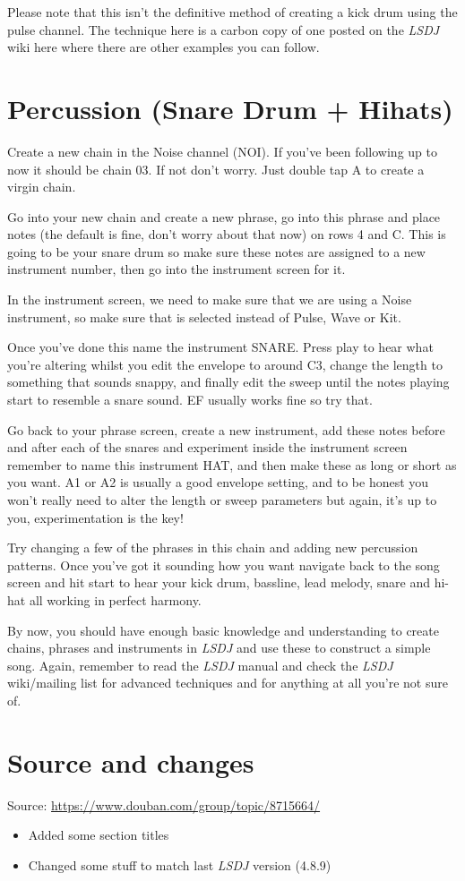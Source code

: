 \documentclass[]{article}
\newcommand{\lsdj}{\textit{LSDJ}\xspace}
\begin{document}
Please note that this isn't the definitive method of creating a kick drum using the pulse channel. The technique here is a carbon copy of one posted on the \lsdj wiki here where there are other examples you can follow.


\section{Percussion (Snare Drum + Hihats)}

Create a new chain in the Noise channel (NOI). If you've been following up to now it should be chain 03. If not don't worry. Just double tap A to create a virgin chain.

Go into your new chain and create a new phrase, go into this phrase and place notes (the default is fine, don't worry about that now) on rows 4 and C. This is going to be your snare drum so make sure these notes are assigned to a new instrument number, then go into the instrument screen for it.

In the instrument screen, we need to make sure that we are using a Noise instrument, so make sure that is selected instead of Pulse, Wave or Kit.

Once you've done this name the instrument SNARE. Press play to hear what you're altering whilst you edit the envelope to around C3, change the length to something that sounds snappy, and finally edit the sweep until the notes playing start to resemble a snare sound. EF usually works fine so try that.

Go back to your phrase screen, create a new instrument, add these notes before and after each of the snares and experiment inside the instrument screen remember to name this instrument HAT, and then make these as long or short as you want. A1 or A2 is usually a good envelope setting, and to be honest you won't really need to alter the length or sweep parameters but again, it's up to you, experimentation is the key!

Try changing a few of the phrases in this chain and adding new percussion patterns. Once you've got it sounding how you want navigate back to the song screen and hit start to hear your kick drum, bassline, lead melody, snare and hi-hat all working in perfect harmony.

By now, you should have enough basic knowledge and understanding to create chains, phrases and instruments in \lsdj and use these to construct a simple song. Again, remember to read the \lsdj manual and check the \lsdj wiki/mailing list for advanced techniques and for anything at all you're not sure of.


\section*{Source and changes}

Source: \url{https://www.douban.com/group/topic/8715664/}

\begin{itemize}
	\item Added some section titles
	\item Changed some stuff to match last \lsdj version (4.8.9)
\end{itemize}
\end{document}

